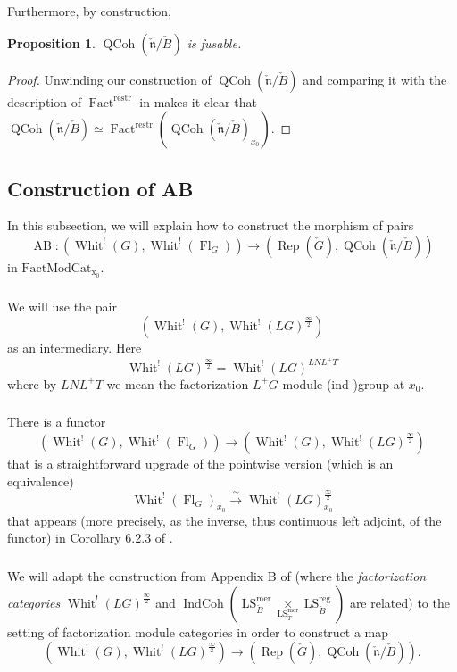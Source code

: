 \documentclass[10pt]{amsart}
\newtheorem{prop}[subsubsection]{Proposition}
\theoremstyle{remark}
\newcommand{\on}[1]{\operatorname{#1}}
\newcommand{\IndCoh}{\on{IndCoh}}
\newcommand{\Gcheck}{\check{G}}
\newcommand{\ncheck}{\check{\mathfrak{n}}}
\newcommand{\Bcheck}{\check{B}}
\newcommand{\Tcheck}{\check{T}}
\newcommand{\FactModCat}{\on{FactModCat_{x_0}}}
\newcommand{\sssec}[1]{\subsubsection{}}
\begin{document}
\sssec{}
Furthermore, by construction,
\begin{prop}
    $\on{QCoh}(\ncheck/\Bcheck)$ is fusable.
\end{prop}

\begin{proof}
    Unwinding our construction of $\on{QCoh}(\ncheck/\Bcheck)$ and comparing it with the description of $\on{Fact}^{\on{restr}}$ in \cite{Katia} makes it clear that $\on{QCoh}(\ncheck/\Bcheck) \simeq \on{Fact}^{\on{restr}}(\on{QCoh}(\ncheck/\Bcheck)_{x_0})$.
\end{proof}

\subsection{Construction of AB} \label{Construction of AB}
In this subsection, we will explain how to construct the morphism of pairs
$$
\on{AB} : ( \on{Whit}^!(G), \on{Whit}^!(\on{Fl}_G)) \longrightarrow (\on{Rep}(\Gcheck), \on{QCoh}(\ncheck/\Bcheck))
$$
in $\FactModCat$.

\sssec{}
We will use the pair
$$
(\on{Whit}^!(G), \on{Whit}^!(LG)^{\frac{\infty}{2}})
$$
as an intermediary. Here
$$
\on{Whit}^!(LG)^{\frac{\infty}{2}} = \on{Whit}^!(LG)^{LNL^+T}
$$
where by $LNL^+T$ we mean the factorization $L^+G$-module (ind-)group at $x_0$.

\sssec{}
There is a functor
$$
(\on{Whit}^!(G), \on{Whit}^!(\on{Fl}_G)) \longrightarrow (\on{Whit}^!(G), \on{Whit}^!(LG)^{\frac{\infty}{2}})
$$
that is a straightforward upgrade of the pointwise version (which is an equivalence)
$$
\on{Whit}^!(\on{Fl}_G)_{x_0} \overset{\simeq}{\longrightarrow} \on{Whit}^!(LG)_{x_0}^{\frac{\infty}{2}}
$$
that appears (more precisely, as the inverse, thus continuous left adjoint, of the functor) in Corollary 6.2.3 of \cite{CPSC2}.

\sssec{}
We will adapt the construction from Appendix B of \cite{GLC3} (where the \emph{factorization categories} $\on{Whit}^!(LG)^{\frac{\infty}{2}}$ and $\IndCoh(\on{LS}_{\Bcheck}^{\on{mer}} \underset{\on{LS}_{\Tcheck}^{\on{mer}}}{\times} \on{LS}_{\Bcheck}^{\on{reg}})$ are related) to the setting of factorization module categories in order to construct a map
$$
(\on{Whit}^!(G), \on{Whit}^!(LG)^{\frac{\infty}{2}}) \longrightarrow (\on{Rep}(\Gcheck), \on{QCoh}(\ncheck/\Bcheck)).
$$
\end{document}
